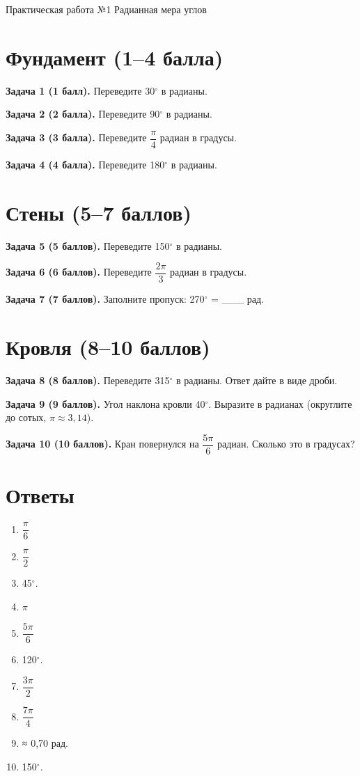 \documentclass{umk-matematika}
\begin{document}
\maketitlepage
    {Практическая работа №1}
    {Радианная мера углов}
    {}

\section{Фундамент (1--4 балла)}

\textbf{Задача 1 (1 балл).} Переведите 30$^\circ$ в радианы.

\textbf{Задача 2 (2 балла).} Переведите 90$^\circ$ в радианы.

\textbf{Задача 3 (3 балла).} Переведите $\dfrac{\pi}{4}$ радиан в градусы.

\textbf{Задача 4 (4 балла).} Переведите 180$^\circ$ в радианы.

\section{Стены (5--7 баллов)}

\textbf{Задача 5 (5 баллов).} Переведите 150$^\circ$ в радианы.

\textbf{Задача 6 (6 баллов).} Переведите $\dfrac{2\pi}{3}$ радиан в градусы.

\textbf{Задача 7 (7 баллов).} Заполните пропуск: 270$^\circ$ = \_\_\_ рад.

\section{Кровля (8--10 баллов)}

\textbf{Задача 8 (8 баллов).} Переведите 315$^\circ$ в радианы. Ответ дайте в виде дроби.

\textbf{Задача 9 (9 баллов).} Угол наклона кровли 40$^\circ$. Выразите в радианах (округлите до сотых, $\pi \approx 3{,}14$).

\textbf{Задача 10 (10 баллов).} Кран повернулся на $\dfrac{5\pi}{6}$ радиан. Сколько это в градусах?

\newpage
\section*{Ответы}

\begin{enumerate}
  \item $\dfrac{\pi}{6}$
  \item $\dfrac{\pi}{2}$
  \item 45$^\circ$.
  \item $\pi$
  \item $\dfrac{5\pi}{6}$
  \item 120$^\circ$.
  \item $\dfrac{3\pi}{2}$
  \item $\dfrac{7\pi}{4}$
  \item ≈ 0,70 рад.
  \item 150$^\circ$.
\end{enumerate}
\end{document}
